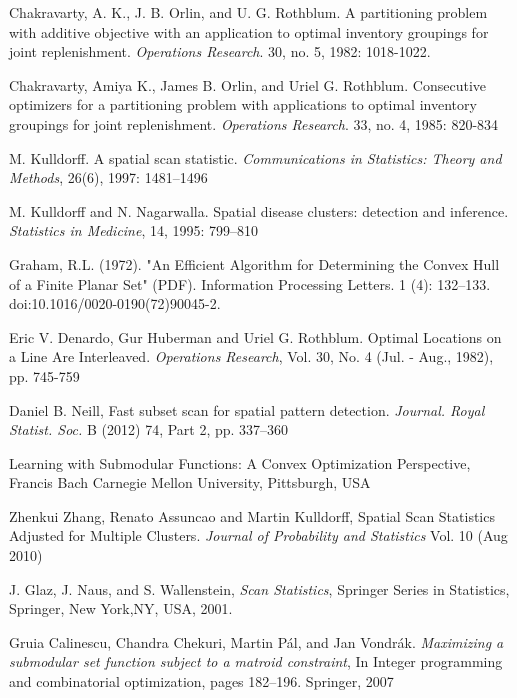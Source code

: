\documentclass{article}
\theoremstyle{case}
\begin{document}
\begin{thebibliography}{1}

    Chakravarty, A. K., J. B. Orlin, and U. G. Rothblum. A partitioning problem with additive objective with an application to optimal inventory groupings for joint replenishment. {\em Operations Research}. 30, no. 5, 1982: 1018-1022.

     Chakravarty, Amiya K., James B. Orlin, and Uriel G. Rothblum. Consecutive optimizers for a partitioning problem with applications to optimal inventory groupings for joint replenishment. {\em Operations Research}. 33, no. 4, 1985: 820-834

	 M. Kulldorff. A spatial scan statistic. {\em Communications in Statistics: Theory and Methods}, 26(6), 1997: 1481–1496

	 M. Kulldorff and N. Nagarwalla. Spatial disease clusters: detection and inference. {\em Statistics in Medicine}, 14, 1995: 799–810
	
	 Graham, R.L. (1972). "An Efficient Algorithm for Determining the Convex Hull of a Finite Planar Set" (PDF). Information Processing Letters. 1 (4): 132–133. doi:10.1016/0020-0190(72)90045-2.	
	
	 Eric V. Denardo, Gur Huberman and Uriel G. Rothblum. Optimal Locations on a Line Are Interleaved. {\em Operations Research}, Vol. 30, No. 4 (Jul. - Aug., 1982), pp. 745-759

	 Daniel B. Neill, Fast subset scan for spatial pattern detection. {\em Journal. Royal Statist. Soc.} B (2012) 74, Part 2, pp. 337–360
	
	 Learning with Submodular Functions: A Convex Optimization Perspective, Francis Bach Carnegie Mellon University, Pittsburgh, USA
	
	 Zhenkui Zhang, Renato Assuncao and Martin Kulldorff, Spatial Scan Statistics Adjusted for Multiple Clusters. {\em Journal of Probability and Statistics} Vol. 10 (Aug 2010)
	
	 J. Glaz, J. Naus, and S. Wallenstein, {\em Scan Statistics}, Springer Series in Statistics, Springer, New York,NY, USA, 2001.
	
	 Gruia Calinescu, Chandra Chekuri, Martin Pál, and Jan Vondrák. {\em Maximizing a submodular set function subject to a matroid constraint}, In Integer programming and combinatorial optimization, pages 182–196. Springer, 2007

\end{thebibliography}
\end{document}
